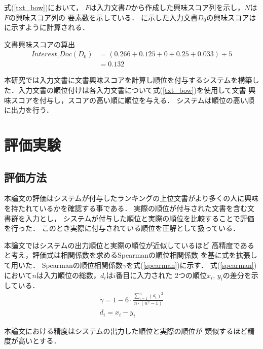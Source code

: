 \documentclass[japanese]{jnlp_1.4}
\newcounter{ex}
\def\ex#1{}
\def\exref#1{}
\begin{document}
式(\ref{txt_bow})において，
$F$は入力文書$D$から作成した興味スコア列を示し，$N$は$F$の興味スコア列の
要素数を示している．
\exref{chasenex2}に示した入力文書$D_0$の興味スコアは\exref{text}に示すように計算される．

\begin{itembox}{\ex{}\label{text}文書興味スコアの算出}
\vspace{-1\baselineskip}
\begin{align*}
 Interest\_Doc(D_0) & =({0.266+0.125+0+0.25+0.033}) \div {5}  \\
   & =0.132
\end{align*}
\vspace{-1.5\baselineskip}
\end{itembox}

本研究では入力文書に文書興味スコアを計算し順位を付与するシステムを構築し
た．入力文書の順位付けは各入力文書について式(\ref{txt_bow})を使用して文書
興味スコアを付与し，スコアの高い順に順位を与える．
システムは順位の高い順に出力を行う．



\section{評価実験}\label{sec_expeval}

\subsection{評価方法}\label{eval_method}

本論文の評価はシステムが付与したランキングの上位文書がより多くの人に興味
を持たれているかを確認する事である．
実際の順位が付与された文書を含む文書群を入力とし，
システムが付与した順位と実際の順位を比較することで評価を行った．
このとき実際に付与されている順位を正解として扱っている．

本論文ではシステムの出力順位と実際の順位が近似しているほど
高精度であると考え，評価式は相関係数を求めるSpearmanの順位相関係数
\cite{Spearman}
を基に式を拡張して用いた．
Spearmanの順位相関係数$\gamma$を式(\ref{spearman})に示す．
式(\ref{spearman})において$n$は入力順位の総数，$d_i$は$i$番目に入力された
2つの順位$x_i$, $y_i$の差分を示している．
\begin{gather}
 \gamma = 1 - 6 \cdot \frac{\sum_{i=1}^{n}(d_i)^2}{n\cdot(n^2-1)} 
	\label{spearman}\\
 d_i=x_i-y_i
	\label{spearman2}
\end{gather}

本論文における精度はシステムの出力した順位と実際の順位が
類似するほど精度が高いとする．
\end{document}
